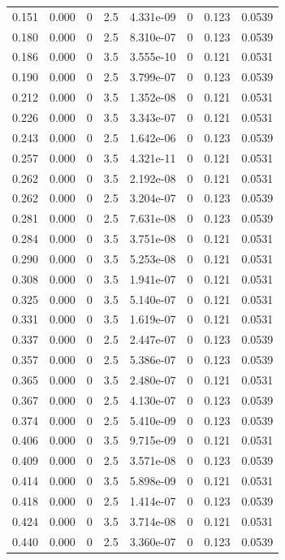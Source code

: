 \documentclass[preview]{standalone}
\begin{document}
{{\begin{tabular}{L{1.2cm}C{1.2cm} C{0.3cm}C{0.5cm} C{1.4cm}C{1.4cm} C{1.4cm}C{1.4cm}}
  0.151  &  0.000  & 0     & 2.5 &  4.331e-09  & 0  & 0.123 &  0.0539   \\ 
  0.180  &  0.000  & 0     & 2.5 &  8.310e-07  & 0  & 0.123 &  0.0539   \\ 
  0.186  &  0.000  & 0     & 3.5 &  3.555e-10  & 0  & 0.121 &  0.0531   \\ 
  0.190  &  0.000  & 0     & 2.5 &  3.799e-07  & 0  & 0.123 &  0.0539   \\ 
  0.212  &  0.000  & 0     & 3.5 &  1.352e-08  & 0  & 0.121 &  0.0531   \\ 
  0.226  &  0.000  & 0     & 3.5 &  3.343e-07  & 0  & 0.121 &  0.0531   \\ 
  0.243  &  0.000  & 0     & 2.5 &  1.642e-06  & 0  & 0.123 &  0.0539   \\ 
  0.257  &  0.000  & 0     & 3.5 &  4.321e-11  & 0  & 0.121 &  0.0531   \\ 
  0.262  &  0.000  & 0     & 3.5 &  2.192e-08  & 0  & 0.121 &  0.0531   \\ 
  0.262  &  0.000  & 0     & 2.5 &  3.204e-07  & 0  & 0.123 &  0.0539   \\ 
  0.281  &  0.000  & 0     & 2.5 &  7.631e-08  & 0  & 0.123 &  0.0539   \\ 
  0.284  &  0.000  & 0     & 3.5 &  3.751e-08  & 0  & 0.121 &  0.0531   \\ 
  0.290  &  0.000  & 0     & 3.5 &  5.253e-08  & 0  & 0.121 &  0.0531   \\ 
  0.308  &  0.000  & 0     & 3.5 &  1.941e-07  & 0  & 0.121 &  0.0531   \\ 
  0.325  &  0.000  & 0     & 3.5 &  5.140e-07  & 0  & 0.121 &  0.0531   \\ 
  0.331  &  0.000  & 0     & 3.5 &  1.619e-07  & 0  & 0.121 &  0.0531   \\ 
  0.337  &  0.000  & 0     & 2.5 &  2.447e-07  & 0  & 0.123 &  0.0539   \\ 
  0.357  &  0.000  & 0     & 2.5 &  5.386e-07  & 0  & 0.123 &  0.0539   \\ 
  0.365  &  0.000  & 0     & 3.5 &  2.480e-07  & 0  & 0.121 &  0.0531   \\ 
  0.367  &  0.000  & 0     & 2.5 &  4.130e-07  & 0  & 0.123 &  0.0539   \\ 
  0.374  &  0.000  & 0     & 2.5 &  5.410e-09  & 0  & 0.123 &  0.0539   \\ 
  0.406  &  0.000  & 0     & 3.5 &  9.715e-09  & 0  & 0.121 &  0.0531   \\ 
  0.409  &  0.000  & 0     & 2.5 &  3.571e-08  & 0  & 0.123 &  0.0539   \\ 
  0.414  &  0.000  & 0     & 3.5 &  5.898e-09  & 0  & 0.121 &  0.0531   \\ 
  0.418  &  0.000  & 0     & 2.5 &  1.414e-07  & 0  & 0.123 &  0.0539   \\ 
  0.424  &  0.000  & 0     & 3.5 &  3.714e-08  & 0  & 0.121 &  0.0531   \\ 
  0.440  &  0.000  & 0     & 2.5 &  3.360e-07  & 0  & 0.123 &  0.0539   \\ 
\hline 
\end{tabular} 

}}
\end{document}
